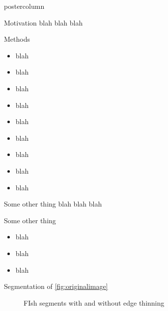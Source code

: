 \documentclass[final]{beamer}
\begin{document}
\begin{frame}
\begin{columns}
\begin{column}{.33\textwidth}
\begin{beamercolorbox}[center,wd=\textwidth]{postercolumn}
\begin{minipage}[T]{.95\textwidth}
{            \begin{block}{Motivation}
              blah blah blah
            \end{block}
            \vfill
            \begin{block}{Methods}
              \begin{itemize}
              \item blah
              \item blah
              \item blah
              \item blah
              \item blah
              \item blah
              \item blah
              \item blah
              \item blah
              \end{itemize}              
            \end{block}
            \vfill
            \begin{block}{Some other thing}
              blah blah blah
            \end{block}
            \vfill
            \begin{block}{Some other thing}
              \begin{itemize}
              \item blah
              \item blah
              \item blah
              \end{itemize}              
            \end{block}
            \vfill
            \begin{block}{Segmentation of \ref{fig:originalimage}}
             \begin{figure}
               \centering
               \caption{FIsh segments with and without edge thinning}

\end{figure}
\end{block}}
\end{minipage}
\end{beamercolorbox}
\end{column}
\end{columns}
\end{frame}
\end{document}
